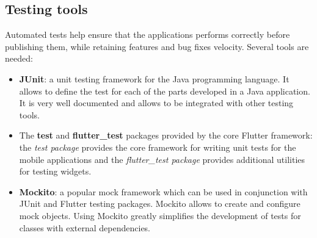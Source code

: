 \subsection{Testing tools}
Automated tests help ensure that the applications performs correctly before publishing them, while retaining features and bug fixes velocity. Several tools are needed:
\begin{itemize}
	\item \textbf{JUnit}: a unit testing framework for the Java programming language. It allows to define the test for each of the	parts developed in a Java application. It is very well documented and allows to be integrated with other testing tools.
	
	\item The \textbf{test} and \textbf{flutter\_test} packages provided by the core Flutter framework: the \textit{test package} provides the core framework for writing unit tests for the mobile applications and the \textit{flutter\_test package} provides additional utilities for testing widgets.
	
	\item \textbf{Mockito}: a popular mock framework which can be used in conjunction with JUnit and Flutter testing packages. Mockito allows to create and configure mock objects. Using Mockito greatly simplifies the development of tests for classes with external dependencies.

\end{itemize}
